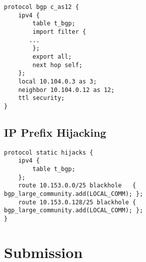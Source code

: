 \begin{lstlisting}
protocol bgp c_as12 {
    ipv4 {
        table t_bgp;
        import filter {
	   ...
        };
        export all;
        next hop self;
    };
    local 10.104.0.3 as 3;
    neighbor 10.104.0.12 as 12;
    ttl security;
}
\end{lstlisting}
 

\subsection{IP Prefix Hijacking} 



\begin{lstlisting}
protocol static hijacks {
    ipv4 {
        table t_bgp;
    };
    route 10.153.0.0/25 blackhole   { bgp_large_community.add(LOCAL_COMM); };
    route 10.153.0.128/25 blackhole { bgp_large_community.add(LOCAL_COMM); };
}
\end{lstlisting}
 


\section{Submission}








